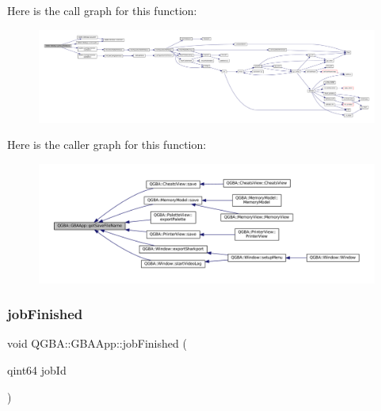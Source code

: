 Here is the call graph for this function\+:
\nopagebreak
\begin{figure}[H]
\begin{center}
\leavevmode
\includegraphics[width=350pt]{class_q_g_b_a_1_1_g_b_a_app_a9a8900559fe370b6143a0f4be535fa16_cgraph}
\end{center}
\end{figure}
Here is the caller graph for this function\+:
\nopagebreak
\begin{figure}[H]
\begin{center}
\leavevmode
\includegraphics[width=350pt]{class_q_g_b_a_1_1_g_b_a_app_a9a8900559fe370b6143a0f4be535fa16_icgraph}
\end{center}
\end{figure}
\mbox{\label{class_q_g_b_a_1_1_g_b_a_app_a7a50fa6391d527db7c25316c77dc165f}} 
\subsubsection{\texorpdfstring{job\+Finished}{jobFinished}}
{\footnotesize\ttfamily void Q\+G\+B\+A\+::\+G\+B\+A\+App\+::job\+Finished (\begin{DoxyParamCaption}\item[{qint64}]{job\+Id }\end{DoxyParamCaption})\hspace{0.3cm}{\ttfamily [signal]}}

